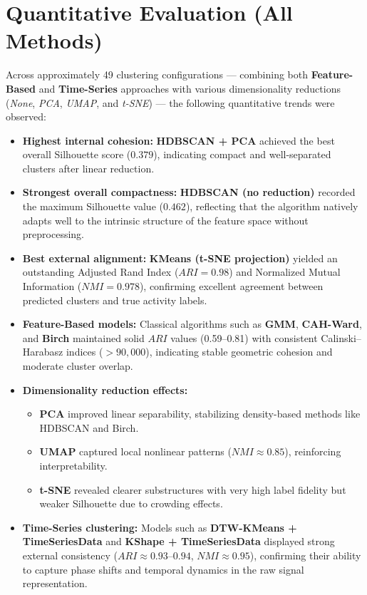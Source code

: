 \documentclass[12pt,a4paper]{report}
\begin{document}
\section{Quantitative Evaluation (All Methods)}
Across approximately 49 clustering configurations — combining both \textbf{Feature-Based} and \textbf{Time-Series} approaches 
with various dimensionality reductions (\textit{None}, \textit{PCA}, \textit{UMAP}, and \textit{t-SNE}) — the following quantitative trends were observed:

\begin{itemize}[label=--, leftmargin=1.2cm, itemsep=2pt]
    \item \textbf{Highest internal cohesion:} \textbf{HDBSCAN + PCA} achieved the best overall Silhouette score ($0.379$), 
    indicating compact and well-separated clusters after linear reduction.
    
    \item \textbf{Strongest overall compactness:} \textbf{HDBSCAN (no reduction)} recorded the maximum Silhouette value ($0.462$),
    reflecting that the algorithm natively adapts well to the intrinsic structure of the feature space without preprocessing.
    
    \item \textbf{Best external alignment:} \textbf{KMeans (t-SNE projection)} yielded an outstanding 
    Adjusted Rand Index ($ARI = 0.98$) and Normalized Mutual Information ($NMI = 0.978$),
    confirming excellent agreement between predicted clusters and true activity labels.
    
    \item \textbf{Feature-Based models:} Classical algorithms such as \textbf{GMM}, \textbf{CAH-Ward}, and \textbf{Birch}
    maintained solid $ARI$ values (0.59–0.81) with consistent Calinski–Harabasz indices ($>90{,}000$),
    indicating stable geometric cohesion and moderate cluster overlap.
    
    \item \textbf{Dimensionality reduction effects:}
    \begin{itemize}[label=--, leftmargin=1.5cm]
        \item \textbf{PCA} improved linear separability, stabilizing density-based methods like HDBSCAN and Birch.
        \item \textbf{UMAP} captured local nonlinear patterns ($NMI \approx 0.85$), reinforcing interpretability.
        \item \textbf{t-SNE} revealed clearer substructures with very high label fidelity but weaker Silhouette due to crowding effects.
    \end{itemize}

    \item \textbf{Time-Series clustering:} 
    Models such as \textbf{DTW-KMeans + TimeSeriesData} and \textbf{KShape + TimeSeriesData} displayed strong external consistency 
    ($ARI \approx 0.93$–$0.94$, $NMI \approx 0.95$), confirming their ability to capture phase shifts and temporal dynamics 
    in the raw signal representation.
\end{itemize}
\end{document}
